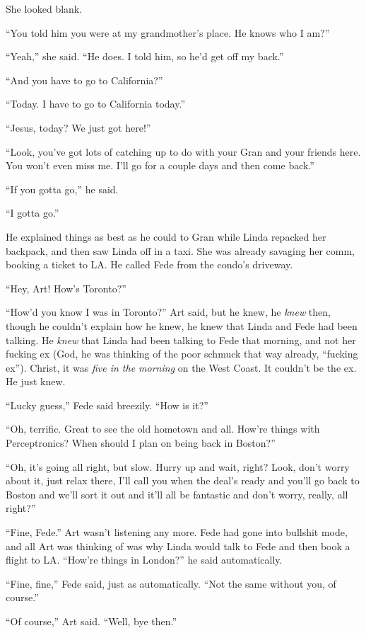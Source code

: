 She looked blank.

“You told him you were at my grandmother’s place. He knows who I
am?”

“Yeah,” she said. “He does. I told him, so he’d get off my back.”

“And you have to go to California?”

“Today. I have to go to California today.”

“Jesus, today? We just got here!”

“Look, you’ve got lots of catching up to do with your Gran and your
friends here. You won’t even miss me. I’ll go for a couple days and
then come back.”

“If you gotta go,” he said.

“I gotta go.”

He explained things as best as he could to Gran while Linda
repacked her backpack, and then saw Linda off in a taxi. She was
already savaging her comm, booking a ticket to LA. He called Fede
from the condo’s driveway.

“Hey, Art! How’s Toronto?”

“How’d you know I was in Toronto?” Art said, but he knew, he
\emph{knew} then, though he couldn’t explain how he knew, he knew
that Linda and Fede had been talking. He \emph{knew} that Linda had
been talking to Fede that morning, and not her fucking ex (God, he
was thinking of the poor schmuck that way already, “fucking ex”).
Christ, it was \emph{five in the morning} on the West Coast. It
couldn’t be the ex. He just knew.

“Lucky guess,” Fede said breezily. “How is it?”

“Oh, terrific. Great to see the old hometown and all. How’re things
with Perceptronics? When should I plan on being back in Boston?”

“Oh, it’s going all right, but slow. Hurry up and wait, right?
Look, don’t worry about it, just relax there, I’ll call you when
the deal’s ready and you’ll go back to Boston and we’ll sort it out
and it’ll all be fantastic and don’t worry, really, all right?”

“Fine, Fede.” Art wasn’t listening any more. Fede had gone into
bullshit mode, and all Art was thinking of was why Linda would talk
to Fede and then book a flight to LA. “How’re things in London?” he
said automatically.

“Fine, fine,” Fede said, just as automatically. “Not the same
without you, of course.”

“Of course,” Art said. “Well, bye then.”

